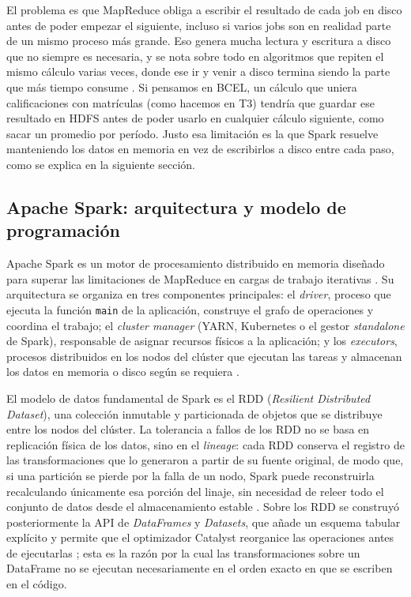 \documentclass[11pt,a4paper]{article}
\begin{document}
El problema es que MapReduce obliga a escribir el resultado de cada job en
disco antes de poder empezar el siguiente, incluso si varios jobs son en
realidad parte de un mismo proceso más grande. Eso genera mucha lectura y
escritura a disco que no siempre es necesaria, y se nota sobre todo en
algoritmos que repiten el mismo cálculo varias veces, donde ese ir y venir
a disco termina siendo la parte que más tiempo consume \cite{ahmed2020}. Si
pensamos en BCEL, un cálculo que uniera calificaciones con matrículas (como
hacemos en T3) tendría que guardar ese resultado en HDFS antes de poder
usarlo en cualquier cálculo siguiente, como sacar un promedio por período.
Justo esa limitación es la que Spark resuelve manteniendo los datos en
memoria en vez de escribirlos a disco entre cada paso, como se explica en
la siguiente sección.

\subsection{Apache Spark: arquitectura y modelo de programación}
\label{sec:spark}

Apache Spark es un motor de procesamiento distribuido en memoria diseñado para
superar las limitaciones de MapReduce en cargas de trabajo iterativas
\cite{zaharia2012}. Su arquitectura se organiza en tres componentes principales:
el \textit{driver}, proceso que ejecuta la función \texttt{main} de la
aplicación, construye el grafo de operaciones y coordina el trabajo; el
\textit{cluster manager} (YARN, Kubernetes o el gestor \textit{standalone} de
Spark), responsable de asignar recursos físicos a la aplicación; y los
\textit{executors}, procesos distribuidos en los nodos del clúster que ejecutan
las tareas y almacenan los datos en memoria o disco según se requiera
\cite{chambers2018}.

El modelo de datos fundamental de Spark es el RDD (\textit{Resilient
Distributed Dataset}), una colección inmutable y particionada de objetos que
se distribuye entre los nodos del clúster. La tolerancia a fallos de los RDD no
se basa en replicación física de los datos, sino en el \textit{lineage}: cada
RDD conserva el registro de las transformaciones que lo generaron a partir de
su fuente original, de modo que, si una partición se pierde por la falla de un
nodo, Spark puede reconstruirla recalculando únicamente esa porción del linaje,
sin necesidad de releer todo el conjunto de datos desde el almacenamiento
estable \cite{zaharia2012}. Sobre los RDD se construyó posteriormente la API de
\textit{DataFrames} y \textit{Datasets}, que añade un esquema tabular explícito
y permite que el optimizador Catalyst reorganice las operaciones antes de
ejecutarlas \cite{armbrust2015}; esta es la razón por la cual las
transformaciones sobre un DataFrame no se ejecutan necesariamente en el orden
exacto en que se escriben en el código.
\end{document}
